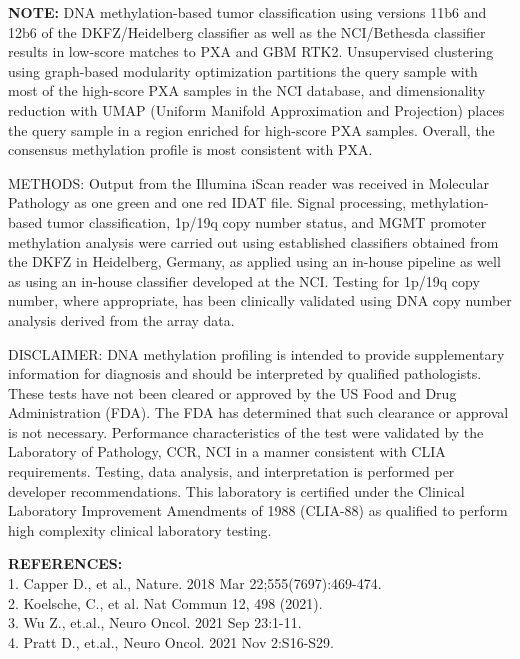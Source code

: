 \documentclass[
	letterpaper, %
	11pt, %
]{CSSullivanBusinessReport}
\begin{document}
\par
\textbf{NOTE:}
DNA methylation-based tumor classification using versions 11b6 and 12b6 of the DKFZ/Heidelberg classifier as well as the NCI/Bethesda classifier results in low-score matches to PXA and GBM RTK2.
Unsupervised clustering using graph-based modularity optimization partitions the query sample with most of the high-score PXA samples in the NCI database, and dimensionality reduction with UMAP (Uniform Manifold Approximation and Projection) places the query sample in a region enriched for high-score PXA samples.
Overall, the consensus methylation profile is most consistent with PXA.

{\footnotesize
METHODS:
Output from the Illumina iScan reader was received in Molecular Pathology as one green and one red IDAT file.
Signal processing, methylation-based tumor classification, 1p/19q copy number status, and MGMT promoter methylation analysis were carried out using established classifiers obtained from the DKFZ in Heidelberg, Germany, as applied using an in-house pipeline as well as using an in-house classifier developed at the NCI.
Testing for 1p/19q copy number, where appropriate, has been clinically validated using DNA copy number analysis derived from the array data.	

DISCLAIMER:
DNA methylation profiling is intended to provide supplementary information for diagnosis and should be interpreted by qualified pathologists. These tests have not been cleared or approved by the US Food and Drug Administration (FDA). The FDA has determined that such clearance or approval is not necessary. Performance characteristics of the test were validated by the Laboratory of Pathology, CCR, NCI in a manner consistent with CLIA requirements. Testing, data analysis, and interpretation is performed per developer recommendations. This laboratory is certified under the Clinical Laboratory Improvement Amendments of 1988 (CLIA-88) as qualified to perform high complexity clinical laboratory testing.
}




\par
{\tiny
\textbf{REFERENCES:}\\
1.	Capper D., et al., Nature. 2018 Mar 22;555(7697):469-474.\\
2.	Koelsche, C., et al. Nat Commun 12, 498 (2021).\\
3.	Wu Z., et.al., Neuro Oncol. 2021 Sep 23:1-11.\\
4.	Pratt D., et.al., Neuro Oncol. 2021 Nov 2:S16-S29.\\
}
\end{document}
